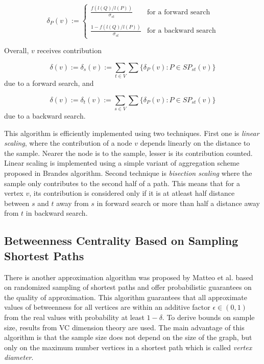 \documentclass[runningheads,a4paper]{llncs}
\begin{document}
\begin{equation*}
	\delta_{P}(v) := \begin{cases}
					\frac{f(l(Q)/l(P))}{\sigma_{st}} & \text{for a forward search} \\\\
					\frac{1 - f(l(Q)/l(P))}{\sigma_{st}} & \text{for a backward search} 
					\end{cases}
\end{equation*}

Overall, $v$ receives contribution 

$$\delta(v) := \delta_{s}(v) := \sum_{t \in V}\sum \{\delta_{P}(v):  P \in SP_{st}(v)\}$$
due to a forward search, and 

$$\delta(v) := \delta_{t}(v) := \sum_{s \in V}\sum \{\delta_{P}(v):  P \in SP_{st}(v)\}$$
due to a backward search. 

This algorithm is efficiently implemented using two techniques. First one is \textit{linear scaling}, where the contribution of a node $v$ depends linearly on the distance to the sample. Nearer the node is to the sample, lesser is its contribution counted. Linear scaling is implemented using a simple variant of aggregation scheme proposed in Brandes algorithm. Second technique is \textit{bisection scaling} where the sample only contributes to the second half of a path. This means that for a vertex $v$, its contribution is considered only if it is at atleast half distance between $s$ and $t$ away from $s$ in forward search or more than half a distance away from $t$ in backward search. 


\subsection*{Betweenness Centrality Based on Sampling Shortest Paths}
There  is another approximation algorithm was proposed by Matteo et al. \cite{matteo} based on randomized sampling of shortest paths and offer probabilistic guarantees on the quality of approximation. This algorithm guarantees that all approximate values of betweenness for all vertices are within an additive factor $\epsilon \in (0,1)$ from the real values with probability at least $1-\delta$. To derive bounds on sample size, results from VC dimension theory\cite{vc} are used. The main advantage of this algorithm is that the sample size does not depend on the size of the graph, but only on the maximum number vertices in a shortest path which is called \textit{vertex diameter}.  
\end{document}
